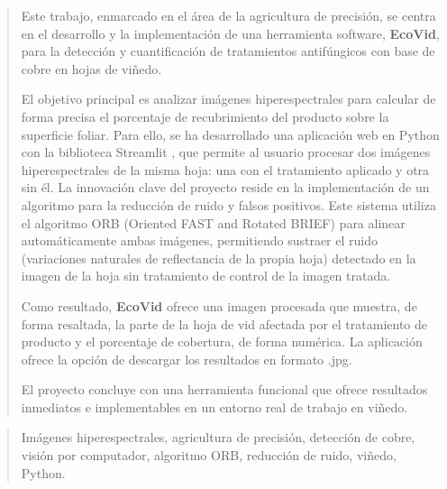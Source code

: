 \documentclass[a4paper,12pt,twoside]{memoir}
\begin{document}
\frontmatter

\renewcommand*\abstractname{Resumen}
\begin{abstract}
Este trabajo, enmarcado en el área de la agricultura de precisión, se centra en el desarrollo y la implementación de una herramienta software, \textbf{EcoVid},  para la detección y cuantificación de tratamientos antifúngicos con base de cobre en hojas de viñedo.

El objetivo principal es analizar imágenes hiperespectrales para calcular de forma precisa el porcentaje de recubrimiento del producto sobre la superficie foliar. Para ello, se ha desarrollado una aplicación web en Python  con la biblioteca Streamlit , que permite al usuario procesar dos imágenes hiperespectrales de la misma hoja: una con el tratamiento aplicado y otra sin él. La innovación clave del proyecto reside en la implementación de un algoritmo para la reducción de ruido y falsos positivos. Este sistema utiliza el algoritmo ORB (Oriented FAST and Rotated BRIEF) para alinear automáticamente ambas imágenes, permitiendo sustraer el ruido (variaciones naturales de reflectancia de la propia hoja) detectado en la imagen de la hoja sin tratamiento de control de la imagen tratada.

Como resultado, \textbf{EcoVid} ofrece una imagen procesada que muestra, de forma resaltada, la parte de la hoja de vid afectada por el tratamiento de producto y el porcentaje de cobertura, de forma numérica. La aplicación ofrece la opción de descargar los resultados en formato .jpg.

El proyecto concluye con una herramienta funcional que ofrece resultados inmediatos e implementables en un entorno real de trabajo en viñedo.
\end{abstract}

\renewcommand*\abstractname{Descriptores}
\begin{abstract}
Imágenes hiperespectrales, agricultura de precisión, detección de cobre, visión por computador, algoritmo ORB, reducción de ruido, viñedo, Python.
\end{abstract}

\clearpage
\end{document}
